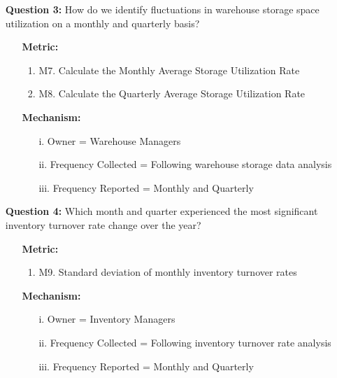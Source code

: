 \documentclass[english,12pt,a4paper]{report}
\begin{document}
\begin{itemize}
		\item[\textbullet] \textbf{Question 3:} How do we identify fluctuations in warehouse storage space utilization on a monthly and quarterly basis? 
		\begin{itemize}
			\item[] \textbf{Metric:}
			\begin{enumerate}[label={}, left=0em]
				\item M7. Calculate the Monthly Average Storage Utilization Rate
				\item M8. Calculate the Quarterly Average Storage Utilization Rate
			\end{enumerate}
			\item[] \textbf{Mechanism:}
			\begin{enumerate}[label={}, left=0em]
				\item[i.] Owner = Warehouse Managers
				\item[ii.] Frequency Collected = Following warehouse storage data analysis
				\item[iii.] Frequency Reported = Monthly and Quarterly
			\end{enumerate}
		\end{itemize}
		
		\item[\textbullet] \textbf{Question 4:} Which month and quarter experienced the most significant inventory turnover rate change over the year? 
		\begin{itemize}
			\item[] \textbf{Metric:}
			\begin{enumerate}[label={}, left=0em]
				\item M9. Standard deviation of monthly inventory turnover rates
			\end{enumerate}
			\item[] \textbf{Mechanism:}
			\begin{enumerate}[label={}, left=0em]
				\item[i.] Owner = Inventory Managers
				\item[ii.] Frequency Collected = Following inventory turnover rate analysis
				\item[iii.] Frequency Reported = Monthly and Quarterly
			\end{enumerate}
		\end{itemize}
		

\end{itemize}
\end{document}
